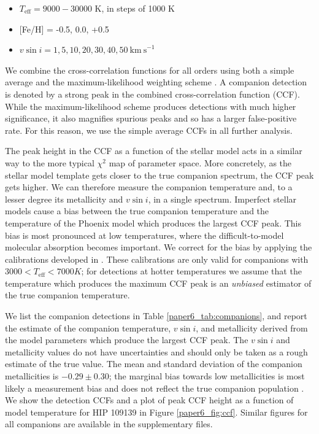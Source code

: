 \begin{itemize}
\item $T_\mathrm{eff} = 9000-30000$ K, in steps of 1000 K
\item {[}Fe/H{]} = -0.5, 0.0, +0.5
\item $v\sin{i} = 1, 5, 10, 20, 30, 40, 50 \ \mathrm{km\ s}^{-1}$
\end{itemize}

We combine the cross-correlation functions for all orders using both a simple average and the maximum-likelihood weighting scheme \citep{Zucker2003}. A companion detection is denoted by a strong peak in the combined cross-correlation function (CCF). While the maximum-likelihood scheme produces detections with much higher significance, it also magnifies spurious peaks and so has a larger false-positive rate. For this reason, we use the simple average CCFs in all further analysis.

The peak height in the CCF as a function of the stellar model acts in a similar way to the more typical $\chi^2$ map of parameter space. More concretely, as the stellar model template gets closer to the true companion spectrum, the CCF peak gets higher. We can therefore measure the companion temperature and, to a lesser degree its metallicity and $v\sin{i}$, in a single spectrum. Imperfect stellar models cause a bias between the true companion temperature and the temperature of the Phoenix model which produces the largest CCF peak. This bias is most pronounced at low temperatures, where the difficult-to-model molecular absorption becomes important. We correct for the bias by applying the calibrations developed in \citet{Gullikson2016}. These calibrations are only valid for companions with $3000 < T_\mathrm{eff} < 7000 K$; for detections at hotter temperatures we assume that the temperature which produces the maximum CCF peak is an \emph{unbiased} estimator of the true companion temperature.

We list the companion detections in Table \ref{paper6_tab:companions}, and report the estimate of the companion temperature, $v\sin{i}$, and metallicity derived from the model parameters which produce the largest CCF peak. The $v\sin{i}$ and metallicity values do not have uncertainties and should only be taken as a rough estimate of the true value. The mean and standard deviation of the companion metallicities is $-0.29 \pm 0.30$; the marginal bias towards low metallicities is most likely a measurement bias and does not reflect the true companion population \citep{Gullikson2016}.  We show the detection CCFs and a plot of peak CCF height as a function of model temperature for HIP 109139 in Figure \ref{paper6_fig:ccf}. Similar figures for all companions are available in the supplementary files.


